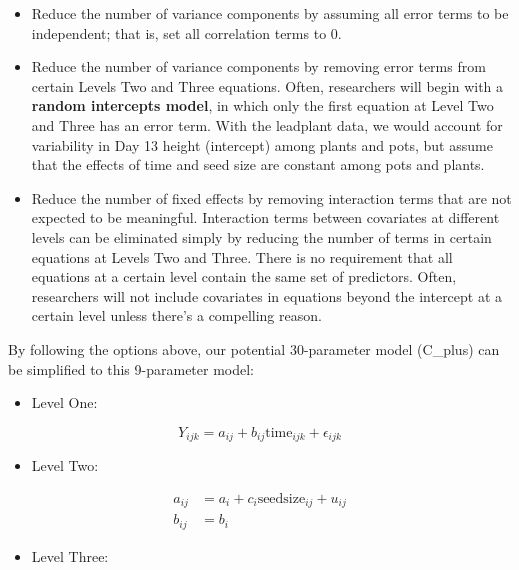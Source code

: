 \documentclass[
]{krantz}
\providecommand{\tightlist}{%
  \setlength{\itemsep}{0pt}\setlength{\parskip}{0pt}}
\begin{document}
\begin{itemize}
\tightlist
\item
  Reduce the number of variance components by assuming all error terms to be independent; that is, set all correlation terms to 0.
\item
  Reduce the number of variance components by removing error terms from certain Levels Two and Three equations. Often, researchers will begin with a \textbf{random intercepts model},  in which only the first equation at Level Two and Three has an error term. With the leadplant data, we would account for variability in Day 13 height (intercept) among plants and pots, but assume that the effects of time and seed size are constant among pots and plants.
\item
  Reduce the number of fixed effects by removing interaction terms that are not expected to be meaningful. Interaction terms between covariates at different levels can be eliminated simply by reducing the number of terms in certain equations at Levels Two and Three. There is no requirement that all equations at a certain level contain the same set of predictors. Often, researchers will not include covariates in equations beyond the intercept at a certain level unless there's a compelling reason.
\end{itemize}

By following the options above, our potential 30-parameter model (C\_plus) can be simplified to this 9-parameter model:

\begin{itemize}
\tightlist
\item
  Level One:
\end{itemize}

\begin{equation*}
Y_{ijk} = a_{ij}+b_{ij}\textrm{time}_{ijk}+\epsilon_{ijk}
\end{equation*}

\begin{itemize}
\tightlist
\item
  Level Two:
\end{itemize}

\begin{align*}
a_{ij} & = a_{i}+c_{i}\textrm{seedsize}_{ij}+u_{ij} \\
b_{ij} & = b_{i}
\end{align*}

\begin{itemize}
\tightlist
\item
  Level Three:
\end{itemize}
\end{document}
